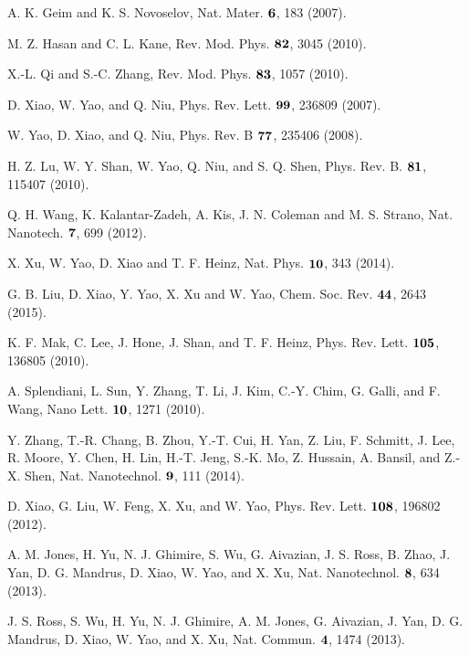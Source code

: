 \documentclass[prb,twocolumn,amsmath,amssymb,superscriptaddress,showpacs]{revtex4}
\begin{document}
\begin{thebibliography}{99}

A. K. Geim and K. S. Novoselov, Nat. Mater. $\bf6$, 183 (2007).

M. Z. Hasan and C. L. Kane, Rev. Mod. Phys. $\bf82$, 3045 (2010).

X.-L. Qi and S.-C. Zhang, Rev. Mod. Phys. $\bf83$, 1057 (2010).

D. Xiao, W. Yao, and Q. Niu, Phys. Rev. Lett. $\bf 99$, 236809 (2007).

W. Yao, D. Xiao, and Q. Niu, Phys. Rev. B $\bf 77$, 235406 (2008).

H. Z. Lu, W. Y. Shan, W. Yao, Q. Niu, and S. Q. Shen, Phys. Rev. B. $\bf81$, 115407 (2010).

Q. H. Wang,	K. Kalantar-Zadeh, A. Kis, J. N. Coleman	and M. S. Strano, Nat. Nanotech. $\bf7$, 699 (2012).

X. Xu,	W. Yao, D. Xiao and T. F. Heinz, Nat. Phys. $\bf10$, 343 (2014).

G. B. Liu, D. Xiao, Y. Yao, X. Xu and W. Yao, Chem. Soc. Rev. $\bf44$, 2643 (2015).

K. F. Mak, C. Lee, J. Hone, J. Shan, and T. F. Heinz, Phys. Rev. Lett. $\bf105$, 136805 (2010).

A. Splendiani, L. Sun, Y. Zhang, T. Li, J. Kim, C.-Y. Chim, G. Galli, and F. Wang, Nano Lett. $\bf10$, 1271 (2010).

Y. Zhang,	T.-R. Chang, B. Zhou, Y.-T. Cui,	H. Yan, Z. Liu,	F. Schmitt, J. Lee,	 R. Moore, Y. Chen,	H. Lin,	H.-T. Jeng,	S.-K. Mo, Z. Hussain, A. Bansil, and Z.-X. Shen, Nat. Nanotechnol. $\bf9$, 111 (2014).

D. Xiao, G. Liu, W. Feng, X. Xu, and W. Yao, Phys. Rev. Lett. $\bf108$, 196802 (2012).

A. M. Jones,	H. Yu,	N. J. Ghimire, S. Wu, G. Aivazian, J. S. Ross, B. Zhao,	 J. Yan, D. G. Mandrus, D. Xiao, W. Yao, and X. Xu, Nat. Nanotechnol. $\bf8$, 634 (2013).

J. S. Ross, S. Wu, H. Yu,	N. J. Ghimire, A. M. Jones, G. Aivazian, J. Yan, D. G. Mandrus, D. Xiao,	W. Yao, and X. Xu, Nat. Commun. $\bf4$, 1474 (2013).


\end{thebibliography}
\end{document}
